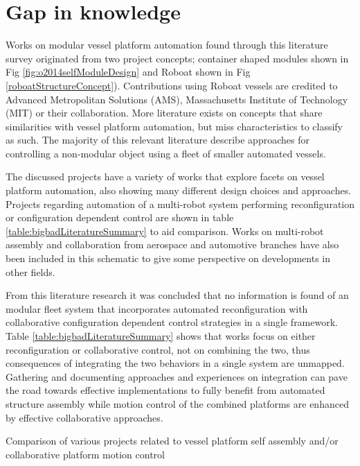 \section{Gap in knowledge}
\label{literatureConclusion}
Works on modular vessel platform automation found through this literature survey originated from two project concepts; container shaped modules \cite{o2014self} shown in Fig \ref{fig:o2014selfModuleDesign} and Roboat \citet{wang2018design} shown in Fig \ref{roboatStructureConcept}). Contributions using Roboat vessels are credited to Advanced Metropolitan Solutions (AMS), Massachusetts Institute of Technology (MIT) or their collaboration. More literature exists on concepts that share similarities with vessel platform automation, but miss characteristics to classify as such. The majority of this relevant literature describe approaches for controlling a non-modular object using a fleet of smaller automated vessels. 

The discussed projects have a variety of works that explore facets on vessel platform automation, also showing many different design choices and approaches. Projects regarding automation of a multi-robot system performing reconfiguration or configuration dependent control are shown in table \ref{table:bigbadLiteratureSummary} to aid comparison. Works on multi-robot assembly and collaboration from aerospace and automotive branches have also been included in this schematic to give some perspective on developments in other fields. 

From this literature research it was concluded that no information is found of an modular fleet system that incorporates automated reconfiguration with collaborative configuration dependent control strategies in a single framework. Table \ref{table:bigbadLiteratureSummary} shows that works focus on either reconfiguration or collaborative control, not on combining the two, thus consequences of integrating the two behaviors in a single system are unmapped. Gathering and documenting approaches and experiences on integration can pave the road towards effective implementations to fully benefit from automated structure assembly while motion control of the combined platforms are enhanced by effective collaborative approaches. 

\newpage
\begin{table}

\footnotesize

\caption{Comparison of various projects related to vessel platform self assembly and/or collaborative platform motion control}
\label{table:bigbadLiteratureSummary}
\end{table}

\newpage


